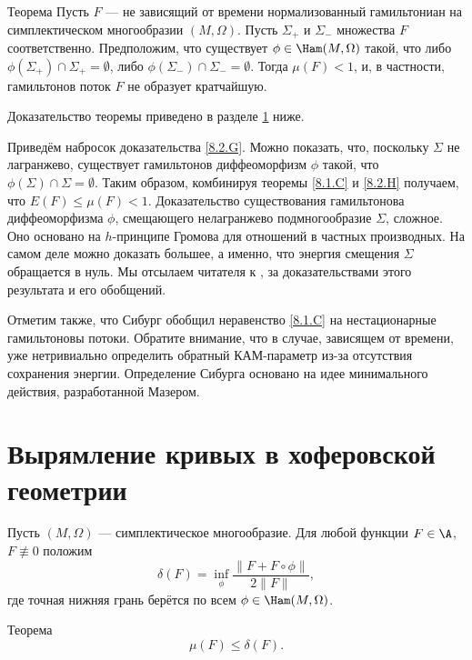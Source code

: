 \begin{thm}{Теорема}\label{8.2.H}
Пусть $F$ --- не зависящий от времени нормализованный гамильтониан на
симплектическом многообразии $ (M, \Omega)$. 
Пусть $\Sigma_+$  и $\Sigma_-$  
  множества  $F$ соответственно.
Предположим, что существует $\phi \in \Ham (M, \Omega)$ такой, что
либо $\phi (\Sigma_+) \cap \Sigma_+ = \emptyset$, либо $\phi
(\Sigma_-) \cap \Sigma_- = \emptyset$. 
Тогда $\mu (F) <1$, и, в частности, гамильтонов поток
 $F$ не образует
кратчайшую.  
\end{thm}

Доказательство теоремы приведено в разделе \ref{sec:8.3} ниже.

Приведём набросок доказательства \ref{8.2.G}.
Можно показать, что, поскольку $\Sigma$ не лагранжево, существует
гамильтонов диффеоморфизм $\phi$ такой, что $\phi (\Sigma) \cap \Sigma
= \emptyset$. 
Таким образом, комбинируя теоремы \ref{8.1.C} и \ref{8.2.H} получаем,
что $E (F) \le \mu (F) <1$. 
Доказательство существования гамильтонова диффеоморфизма $\phi$,
смещающего нелагранжево подмногообразие $\Sigma$, сложное. 
Оно основано на $h$-принципе Громова для отношений в частных производных.
На самом деле можно доказать большее, а именно, что энергия смещения
$\Sigma$ обращается в нуль. 
Мы отсылаем читателя к \cite{P2}, \cite{LS} за доказательствами этого
результата и его обобщений. 

Отметим также, что Сибург \cite{Si2} обобщил неравенство \ref{8.1.C}
на нестационарные гамильтоновы потоки. 
Обратите внимание, что в случае, зависящем от времени, уже
нетривиально определить обратный КАМ-параметр из-за отсутствия
сохранения энергии. 
Определение Сибурга основано на идее минимального действия,
разработанной Мазером. 

\section{Вырямление кривых в хоферовской геометрии}\label{sec:8.3}

Пусть $(M, \Omega)$ --- симплектическое многообразие.
Для любой функции $F \in \A$, $F \not\equiv 0$ положим 
\[\delta(F)=\inf_\phi \frac{\|F+ F \circ \phi\|}{2\|F\|},\]
где точная нижняя грань берётся по всем $\phi \in \Ham (M, \Omega)$.

\begin{thm}[(\cite{BP2})]{Теорема}\label{8.3.A}
\[\mu (F) \le \delta (F).\]
\end{thm}

